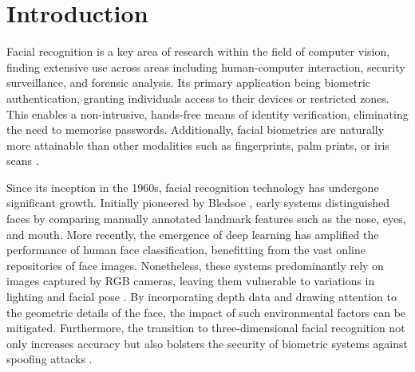 \documentclass{mpaper}
\begin{document}
\section{Introduction}
Facial recognition is a key area of research within the field of computer vision, finding extensive use across areas including human-computer interaction, security surveillance, and forensic analysis. Its primary application being biometric authentication, granting individuals access to their devices or restricted zones. This enables a non-intrusive, hands-free means of identity verification, eliminating the need to memorise passwords. Additionally, facial biometrics are naturally more attainable than other modalities such as fingerprints, palm prints, or iris scans \cite{zhou20183d}.

Since its inception in the 1960s, facial recognition technology has undergone significant growth. Initially pioneered by Bledsoe \cite{bledsoe1966model}, early systems distinguished faces by comparing manually annotated landmark features such as the nose, eyes, and mouth. More recently, the emergence of deep learning has amplified the performance of human face classification, benefitting from the vast online repositories of face images. Nonetheless, these systems predominantly rely on images captured by RGB cameras, leaving them vulnerable to variations in lighting and facial pose \cite{xu2004depth}. By incorporating depth data and drawing attention to the geometric details of the face, the impact of such environmental factors can be mitigated. Furthermore, the transition to three-dimensional facial recognition not only increases accuracy but also bolsters the security of biometric systems against spoofing attacks \cite{wen2015face}.
\end{document}
